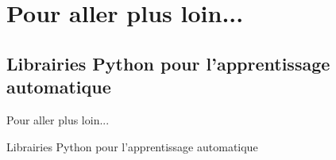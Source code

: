 \documentclass[french]{beamer}
\begin{document}
\section{Pour aller plus loin...}

\subsection{Librairies Python pour l'apprentissage automatique}

\begin{frame}{Pour aller plus loin...}
\vspace{0.5cm}

Librairies Python pour l'apprentissage automatique

\begin{figure}%
    \centering
    \href{https://www.tensorflow.org/}{}%
    \qquad
    \href{http://deeplearning.net/software/theano/}{}%
    \label{fig:example}%
\end{figure}

\begin{figure}
\centering
	\href{http://pytorch.org/}{}%
\end{figure}

\begin{figure}%
    \centering
    \href{https://keras.io/}{}%
    \qquad
    \href{http://scikit-learn.org/stable/}{}%
    \label{fig:example}%
\end{figure}

\end{frame}
\end{document}
